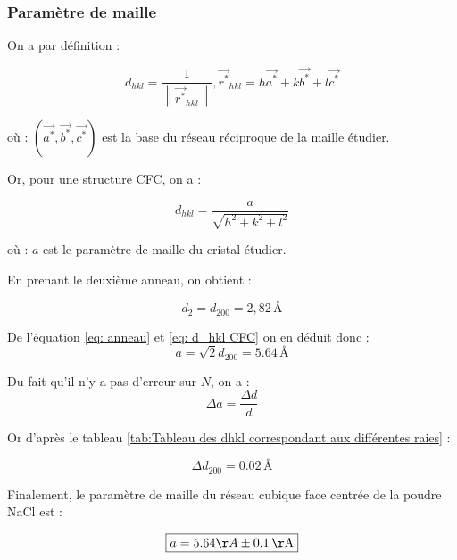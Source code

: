 \subsubsection{Paramètre de maille}
\begin{flushleft}
	On a par définition :
	
	\begin{equation}
		d_{hkl} = \frac{1}{\left\| \vec{r^*}_{hkl}^{}  \right\|} , \vec{r^*}_{hkl} = h\vec{a^*} + k\vec{b^*} + l\vec{c^*}
	\end{equation}
	
	où : $(\vec{a^*},\vec{b^*},\vec{c^*})$ est la base du réseau réciproque de la maille étudier.
	
	Or, pour une structure CFC, on a : 
	
	\begin{equation}\label{eq: d_hkl CFC}
		d_{hkl} = \frac{a}{\sqrt{h^2+ k^2 +l^2 }}
	\end{equation} 
	
	où : $a$ est le paramètre de maille du cristal étudier.


\vspace{0.2cm}
	En prenant le deuxième anneau, on obtient :
	
\begin{equation} \label{eq: anneau}
	d_2 = d_{200} = 2,82 \, \text{\AA}
\end{equation}	

De l'équation \ref{eq: anneau} et \ref{eq: d_hkl CFC} on en déduit donc :
\begin{equation}
		 a = \sqrt{2}d_{200}  = 5.64 \, \text{\AA}
\end{equation}


	
	Du fait qu'il n'y a pas d'erreur sur $N$, on a :
	\begin{equation}
			 \Delta a = \frac{\Delta d}{d}
	\end{equation}

	
Or	d'après le tableau \ref{tab:Tableau des dhkl correspondant aux différentes raies} : 
	
	\begin{equation}
		\Delta d_{200} = 0.02 \, \text{\AA} 
	\end{equation} 
	
Finalement, le paramètre de maille du réseau cubique face centrée de la poudre NaCl est :

\begin{equation}
 \boxed{a = 5.64 \AA \pm 0.1 \, \text{\AA}}	
\end{equation} 
	
\end{flushleft}
